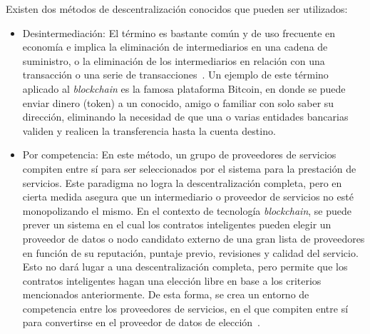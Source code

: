 Existen dos métodos de descentralización conocidos que pueden ser utilizados:
\begin{itemize}
    \item Desintermediación: El término es bastante común y de uso frecuente en economía e implica la eliminación de intermediarios en una cadena de suministro, o la eliminación de los intermediarios en relación con una transacción o una serie de transacciones~\cite{lin2015infinite}. Un ejemplo de este término aplicado al \textit{blockchain} es la famosa plataforma Bitcoin, en donde se puede  enviar dinero (token) a un conocido, amigo o familiar con solo saber su dirección, eliminando la  necesidad de que una o varias entidades bancarias validen y realicen la transferencia hasta la cuenta destino.
    \item Por competencia:  En este método, un grupo de proveedores de servicios compiten entre sí para ser seleccionados por el sistema para la prestación de servicios. Este paradigma no logra la descentralización completa, pero en cierta medida asegura que un intermediario o proveedor de servicios no esté monopolizando el mismo. En el contexto de tecnología \textit{blockchain}, se puede prever un sistema en el cual los contratos inteligentes pueden elegir un proveedor de datos o nodo candidato externo de una gran lista de proveedores en función de su reputación, puntaje previo, revisiones y calidad del servicio. Esto no dará lugar a una descentralización completa, pero permite que los contratos inteligentes hagan una elección libre en base a los criterios mencionados anteriormente. De esta forma, se crea un entorno de competencia entre los proveedores de servicios, en el que compiten entre sí para convertirse en el proveedor de datos de elección~\cite{bashir2017mastering}.
\end{itemize}

